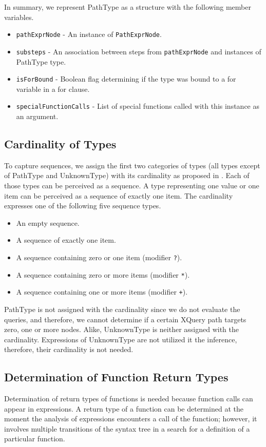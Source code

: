 In summary, we represent PathType as a structure with the following member variables.
\begin{itemize}
\item \texttt{pathExprNode} - An instance of \texttt{PathExprNode}.
\item \texttt{substeps} - An association between steps from \texttt{pathExprNode} and instances of PathType type.
\item \texttt{isForBound} - Boolean flag determining if the type was bound to a for variable in a for clause.
\item \texttt{specialFunctionCalls} - List of special functions called with this instance as an argument.
\end{itemize}

\subsection{Cardinality of Types}

To capture sequences, we assign the first two categories of types (all types except of PathType and UnknownType) with its cardinality as proposed in \cite{thesis_schejbal}. Each of those types can be perceived as a sequence. A type representing one value or one item can be perceived as a sequence of exactly one item. The cardinality expresses one of the following five sequence types.

\begin{itemize}
\item An empty sequence.
\item A sequence of exactly one item.
\item A sequence containing zero or one item (modifier \texttt{?}).
\item A sequence containing zero or more items (modifier \texttt{*}).
\item A sequence containing one or more items (modifier \texttt{+}).
\end{itemize}

PathType is not assigned with the cardinality since we do not evaluate the queries, and therefore, we cannot determine if a certain XQuery path targets zero, one or more nodes. Alike, UnknownType is neither assigned with the cardinality. Expressions of UnknownType are not utilized it the inference, therefore, their cardinality is not needed.

\subsection{Determination of Function Return Types}
Determination of return types of functions is needed because function calls can appear in expressions. A return type of a function can be determined at the moment the analysis of expressions encounters a call of the function; however, it involves multiple transitions of the syntax tree in a search for a definition of a particular function.

